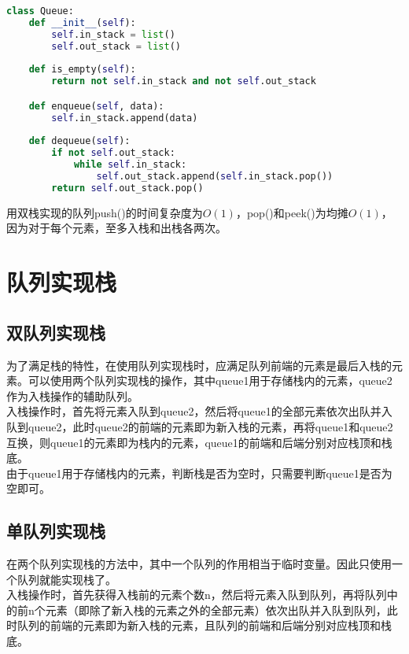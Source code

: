 \begin{lstlisting}[language=Python]
class Queue:
    def __init__(self):
        self.in_stack = list()
        self.out_stack = list()
    
    def is_empty(self):
        return not self.in_stack and not self.out_stack

    def enqueue(self, data):
        self.in_stack.append(data)
    
    def dequeue(self):
        if not self.out_stack:
            while self.in_stack:
                self.out_stack.append(self.in_stack.pop())
        return self.out_stack.pop()
\end{lstlisting}

用双栈实现的队列push()的时间复杂度为$ O(1) $，pop()和peek()为均摊$ O(1) $，因为对于每个元素，至多入栈和出栈各两次。

\newpage

\section{队列实现栈}

\subsection{双队列实现栈}

为了满足栈的特性，在使用队列实现栈时，应满足队列前端的元素是最后入栈的元素。可以使用两个队列实现栈的操作，其中queue1用于存储栈内的元素，queue2作为入栈操作的辅助队列。 \\

入栈操作时，首先将元素入队到queue2，然后将queue1的全部元素依次出队并入队到queue2，此时queue2的前端的元素即为新入栈的元素，再将queue1和queue2互换，则queue1的元素即为栈内的元素，queue1的前端和后端分别对应栈顶和栈底。 \\

由于queue1用于存储栈内的元素，判断栈是否为空时，只需要判断queue1是否为空即可。

\subsection{单队列实现栈}

在两个队列实现栈的方法中，其中一个队列的作用相当于临时变量。因此只使用一个队列就能实现栈了。 \\

入栈操作时，首先获得入栈前的元素个数n，然后将元素入队到队列，再将队列中的前n个元素（即除了新入栈的元素之外的全部元素）依次出队并入队到队列，此时队列的前端的元素即为新入栈的元素，且队列的前端和后端分别对应栈顶和栈底。 \\

